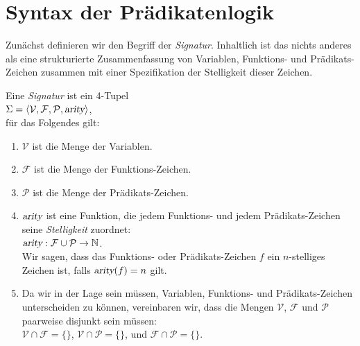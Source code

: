 \section{Syntax der Pr\"{a}dikatenlogik}
Zun\"{a}chst definieren wir den Begriff der \emph{Signatur}.  Inhaltlich ist das nichts anderes als eine 
strukturierte Zusammenfassung von Variablen, Funktions- und Pr\"{a}dikats-Zeichen zusammen mit
einer Spezifikation der Stelligkeit dieser Zeichen.
 
\begin{Definition}[Signatur]
  Eine {\emph{\color{blue}Signatur}} ist ein 4-Tupel \\[0.2cm]
  \hspace*{1.3cm} $\Sigma = \langle \mathcal{V}, \mathcal{F}, \mathcal{P}, \textsl{arity} \rangle$, \\[0.2cm]
  f\"{u}r das Folgendes gilt: 
  \begin{enumerate}
  \item $\mathcal{V}$ ist die Menge der Variablen.
  \item $\mathcal{F}$ ist die Menge der Funktions-Zeichen.
  \item $\mathcal{P}$ ist die Menge der Pr\"{a}dikats-Zeichen.
  \item $\textsl{arity}$ ist eine Funktion, die jedem Funktions- und jedem Pr\"{a}dikats-Zeichen seine
        {\emph{\color{blue}Stelligkeit}} zuordnet: \\[0.2cm]
        \hspace*{1.3cm} $\textsl{arity}: \mathcal{F} \cup \mathcal{P} \rightarrow \mathbb{N}$. \\[0.2cm]
        Wir sagen, dass das Funktions- oder Pr\"{a}dikats-Zeichen $f$ ein
        $n$-stelliges Zeichen ist, falls $\textsl{arity}(f) = n$ gilt.
  \item Da wir in der Lage sein m\"{u}ssen, Variablen, Funktions- und Pr\"{a}dikats-Zeichen
        unterscheiden zu k\"{o}nnen, vereinbaren wir, dass die Mengen $\mathcal{V}$,
        $\mathcal{F}$ und $\mathcal{P}$ paarweise disjunkt sein m\"{u}ssen: \\[0.2cm] 
        \hspace*{1.3cm} $\mathcal{V} \cap \mathcal{F} = \{\}$, \quad
                        $\mathcal{V} \cap \mathcal{P} = \{\}$, \quad und \quad
                        $\mathcal{F} \cap \mathcal{P} = \{\}$. \eox
  \end{enumerate}
\end{Definition}

